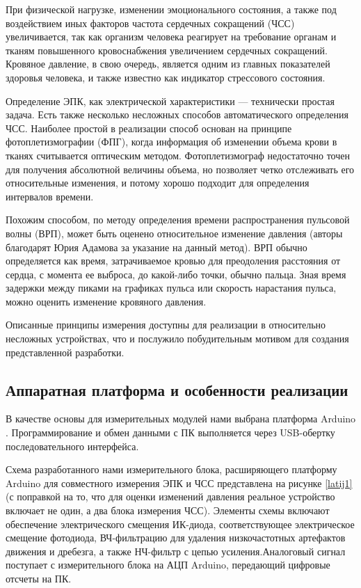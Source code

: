 \documentclass[10pt, a5paper]{article}
\begin{document}
При физической нагрузке, изменении эмоционального состояния, а также под воздействием иных факторов частота сердечных сокращений (ЧСС) увеличивается, так как организм человека реагирует на требование органам и тканям повышенного кровоснабжения увеличением сердечных сокращений. Кровяное давление, в свою очередь, является одним из главных показателей здоровья человека, и также известно как индикатор стрессового состояния.

Определение ЭПК, как электрической характеристики --- технически простая задача. Есть также несколько несложных способов автоматического определения ЧСС. Наиболее простой в реализации способ основан на принципе фотоплетизмографии (ФПГ), когда информация об изменении объема крови в тканях считывается оптическим методом. Фотоплетизмограф недостаточно точен для получения абсолютной величины объема, но позволяет четко отслеживать его относительные изменения, и потому хорошо подходит для определения интервалов времени.

Похожим способом, по методу определения времени распространения пульсовой волны (ВРП), может быть оценено относительное изменение давления (авторы благодарят Юрия Адамова за указание на данный метод). ВРП обычно определяется как время, затрачиваемое кровью для преодоления расстояния от сердца, с момента ее выброса, до какой-либо точки, обычно пальца. Зная время задержки между пиками на графиках пульса или скорость нарастания пульса, можно оценить изменение кровяного давления.

Описанные принципы измерения доступны для реализации в относительно несложных устройствах, что и послужило побудительным мотивом для создания представленной разработки.

\subsection*{Аппаратная платформа и особенности реализации}

В качестве основы для измерительных модулей нами выбрана платформа Arduino \cite{bib2}. Программирование и обмен данными с ПК выполняется через USB-обертку последовательного интерфейса.

Схема разработанного нами измерительного блока, расширяющего платформу Arduino для совместного измерения ЭПК и ЧСС представлена на  рисунке \ref{latij1} (с поправкой на то, что для оценки изменений давления реальное устройство включает не один, а два блока измерения ЧСС). Элементы схемы включают обеспечение электрического смещения ИК-диода, соответствующее электрическое смещение фотодиода, ВЧ-фильтрацию для удаления низкочастотных артефактов движения и дребезга, а также НЧ-фильтр с цепью усиления.Аналоговый сигнал поступает с измерительного блока на АЦП Arduino, передающий цифровые отсчеты на ПК.
\end{document}
